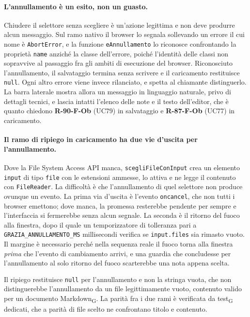 \documentclass[a4paper, 10pt]{article}
\begin{document}
\paragraph{L'annullamento è un esito, non un guasto.}
Chiudere il selettore senza scegliere è un'azione legittima e non deve produrre alcun messaggio. Sul ramo nativo il browser lo segnala sollevando un errore il cui nome è \texttt{AbortError}, e la funzione \texttt{eAnnullamento} lo riconosce confrontando la proprietà \texttt{name} anziché la classe dell'errore, poiché l'identità delle classi non sopravvive al passaggio fra gli ambiti di esecuzione del browser. Riconosciuto l'annullamento, il salvataggio termina senza scrivere e il caricamento restituisce \texttt{null}. Ogni altro errore viene invece rilanciato, e spetta al chiamante distinguerlo. La barra laterale mostra allora un messaggio in linguaggio naturale, privo di dettagli tecnici, e lascia intatti l'elenco delle note e il testo dell'editor, che è quanto chiedono \textbf{R-90-F-Ob} (UC79) in salvataggio e \textbf{R-87-F-Ob} (UC77) in caricamento.

\paragraph{Il ramo di ripiego in caricamento ha due vie d'uscita per l'annullamento.}
Dove la File System Access API manca, \texttt{scegliFileConInput} crea un elemento \texttt{input} di tipo \texttt{file} con le estensioni ammesse, lo attiva e ne legge il contenuto con \texttt{FileReader}. La difficoltà è che l'annullamento di quel selettore non produce ovunque un evento. La prima via d'uscita è l'evento \texttt{oncancel}, che non tutti i browser emettono; dove manca, la promessa resterebbe pendente per sempre e l'interfaccia si fermerebbe senza alcun segnale. La seconda è il ritorno del fuoco alla finestra, dopo il quale un temporizzatore di tolleranza pari a \texttt{GRAZIA\_ANNULLAMENTO\_MS} millisecondi verifica se \texttt{input.files} sia rimasto vuoto. Il margine è necessario perché nella sequenza reale il fuoco torna alla finestra \textit{prima} che l'evento di cambiamento arrivi, e una guardia che concludesse per l'annullamento al solo ritorno del fuoco scarterebbe una nota appena scelta.

Il ripiego restituisce \texttt{null} per l'annullamento e non la stringa vuota, che non distinguerebbe l'annullamento da un file legittimamente vuoto, contenuto valido per un documento Markdown\textsubscript{G}. La parità fra i due rami è verificata da test\textsubscript{G} dedicati, che a parità di file scelto ne confrontano titolo e contenuto.
\end{document}

